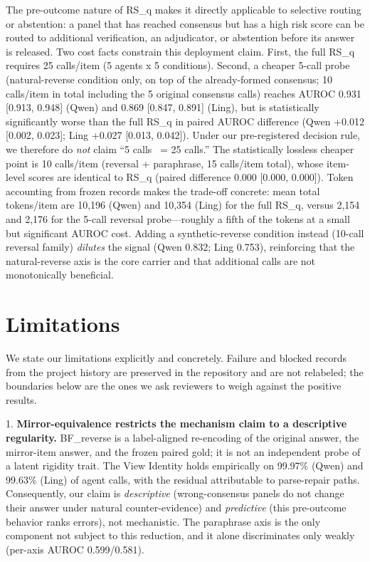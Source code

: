 \documentclass[11pt]{article}
\begin{document}
The pre-outcome nature of RS\_q makes it directly applicable to selective routing or abstention: a panel that has reached consensus but has a high risk score can be routed to additional verification, an adjudicator, or abstention before its answer is released. Two cost facts constrain this deployment claim. First, the full RS\_q requires 25 calls/item (5 agents x 5 conditions). Second, a cheaper 5-call probe (natural-reverse condition only, on top of the already-formed consensus; 10 calls/item in total including the 5 original consensus calls) reaches AUROC 0.931 [0.913, 0.948] (Qwen) and 0.869 [0.847, 0.891] (Ling), but is statistically significantly worse than the full RS\_q in paired AUROC difference (Qwen +0.012 [0.002, 0.023]; Ling +0.027 [0.013, 0.042]). Under our pre-registered decision rule, we therefore do \emph{not} claim “5 calls ~= 25 calls.” The statistically lossless cheaper point is 10 calls/item (reversal + paraphrase, 15 calls/item total), whose item-level scores are identical to RS\_q (paired difference 0.000 [0.000, 0.000]). Token accounting from frozen records makes the trade-off concrete: mean total tokens/item are 10,196 (Qwen) and 10,354 (Ling) for the full RS\_q, versus 2,154 and 2,176 for the 5-call reversal probe—roughly a fifth of the tokens at a small but significant AUROC cost. Adding a synthetic-reverse condition instead (10-call reversal family) \emph{dilutes} the signal (Qwen 0.832; Ling 0.753), reinforcing that the natural-reverse axis is the core carrier and that additional calls are not monotonically beneficial.

\section{Limitations}

We state our limitations explicitly and concretely. Failure and blocked records from the project history are preserved in the repository and are not relabeled; the boundaries below are the ones we ask reviewers to weigh against the positive results.

1. \textbf{Mirror-equivalence restricts the mechanism claim to a descriptive regularity.}
   BF\_reverse is a label-aligned re-encoding of the original answer, the mirror-item answer, and the frozen paired gold; it is not an independent probe of a latent rigidity trait. The View Identity holds empirically on 99.97\% (Qwen) and 99.63\% (Ling) of agent calls, with the residual attributable to parse-repair paths. Consequently, our claim is \emph{descriptive} (wrong-consensus panels do not change their answer under natural counter-evidence) and \emph{predictive} (this pre-outcome behavior ranks errors), not mechanistic. The paraphrase axis is the only component not subject to this reduction, and it alone discriminates only weakly (per-axis AUROC 0.599/0.581).
\end{document}
